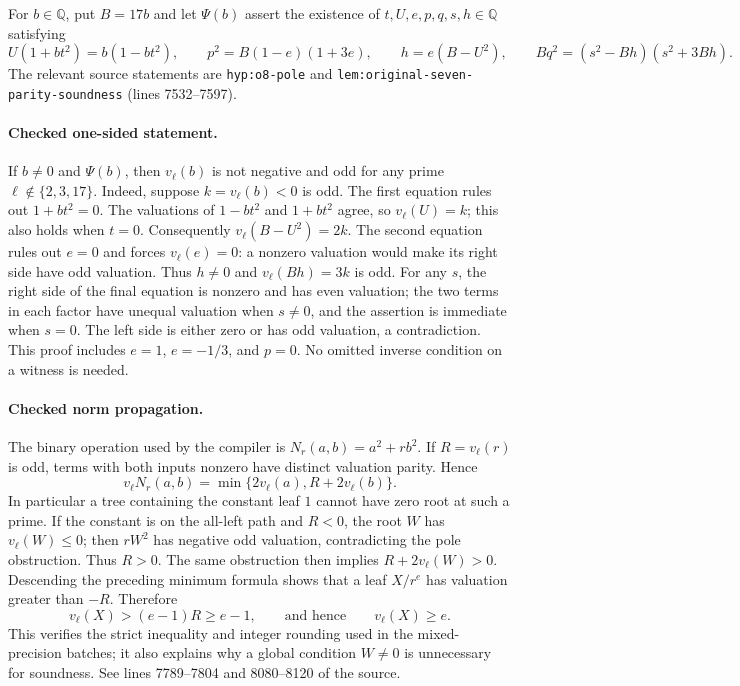 For $b\in\mathbb Q$, put $B=17b$ and let $\Psi(b)$ assert the existence
of $t,U,e,p,q,s,h\in\mathbb Q$ satisfying
\[
 U(1+bt^2)=b(1-bt^2),\qquad p^2=B(1-e)(1+3e),\qquad
 h=e(B-U^2),\qquad Bq^2=(s^2-Bh)(s^2+3Bh).
\]
The relevant source statements are
\texttt{hyp:o8-pole} and \texttt{lem:original-seven-parity-soundness}
(lines 7532--7597).

\paragraph{Checked one-sided statement.}
If $b\ne0$ and $\Psi(b)$, then $v_\ell(b)$ is not negative and odd
for any prime $\ell\notin\{2,3,17\}$.  Indeed, suppose
$k=v_\ell(b)<0$ is odd.  The first equation rules out $1+bt^2=0$.
The valuations of $1-bt^2$ and $1+bt^2$ agree, so $v_\ell(U)=k$;
this also holds when $t=0$.  Consequently
$v_\ell(B-U^2)=2k$.  The second equation rules out $e=0$ and forces
$v_\ell(e)=0$: a nonzero valuation would make its right side have
odd valuation.  Thus $h\ne0$ and $v_\ell(Bh)=3k$ is odd.
For any $s$, the right side of the final equation is nonzero and has
even valuation; the two terms in each factor have unequal valuation
when $s\ne0$, and the assertion is immediate when $s=0$.
The left side is either zero or has odd valuation, a contradiction.
This proof includes $e=1$, $e=-1/3$, and $p=0$.  No omitted inverse
condition on a witness is needed.

\paragraph{Checked norm propagation.}
The binary operation used by the compiler is
$N_r(a,b)=a^2+rb^2$.  If $R=v_\ell(r)$ is odd, terms with both inputs
nonzero have distinct valuation parity.  Hence
\[
 v_\ell N_r(a,b)=\min\{2v_\ell(a),R+2v_\ell(b)\}.
\]
In particular a tree containing the constant leaf $1$ cannot have zero
root at such a prime.  If the constant is on the all-left path and
$R<0$, the root $W$ has $v_\ell(W)\le0$; then $rW^2$ has negative
odd valuation, contradicting the pole obstruction.  Thus $R>0$.
The same obstruction then implies
$R+2v_\ell(W)>0$.  Descending the preceding minimum formula shows
that a leaf $X/r^e$ has valuation greater than $-R$.  Therefore
\[
 v_\ell(X)>(e-1)R\ge e-1,
 \qquad\text{and hence}\qquad v_\ell(X)\ge e.
\]
This verifies the strict inequality and integer rounding used in the
mixed-precision batches; it also explains why a global condition
$W\ne0$ is unnecessary for soundness.  See lines 7789--7804 and
8080--8120 of the source.

